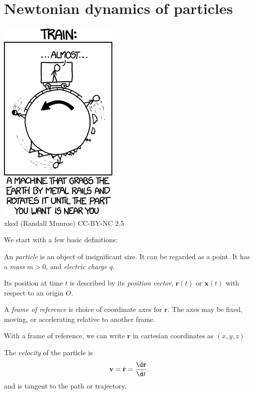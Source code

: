 \documentclass[a4paper]{article}
\begin{document}
\tableofcontents
\section{Newtonian dynamics of particles}
\begin{center}
  \includegraphics[scale=0.75]{images/xkcd_train.png}\\
  xkcd (Randall Munroe) CC-BY-NC 2.5
\end{center}
We start with a few basic definitions:
\begin{defi}[Particle]
  An \emph{particle} is an object of insignificant size. It can be regarded as a point. It has a \emph{mass} $m > 0$, and \emph{electric charge} $q$.

  Its position at time $t$ is described by its \emph{position vector}, $\mathbf{r}(t)$ or $\mathbf{x}(t)$ with respect to an origin $O$.
\end{defi}

\begin{defi}
  A \emph{frame of reference} is choice of coordinate axes for $\mathbf{r}$. The axes may be fixed, moving, or accelerating relative to another frame.

  With a frame of reference, we can write $\mathbf{r}$ in cartesian coordinates as $(x, y, z)$
\end{defi}

\begin{defi}[Velocity]
  The \emph{velocity} of the particle is
  \[
    \mathbf{v} = \dot{\mathbf{r}} = \frac{\d \mathbf{r}}{\d t}.
  \]
  and is tangent to the path or trajectory.
\end{defi}
\end{document}
